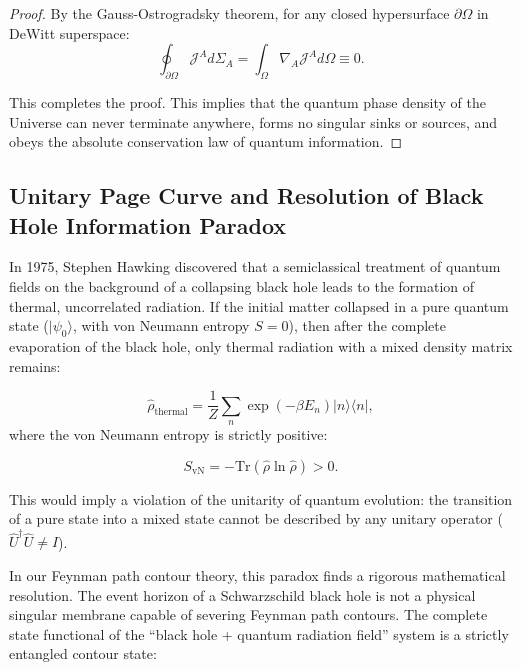 \documentclass[11pt,a4paper]{article}
\theoremstyle{definition}
\begin{document}
\begin{proof}
By the Gauss-Ostrogradsky theorem, for any closed hypersurface $\partial\Omega$ in DeWitt superspace:
\begin{equation}\label{eq:1.105}\tag{1.105}
\oint_{\partial\Omega} \mathcal{J}^A d\Sigma_A = \int_\Omega \nabla_A \mathcal{J}^A d\Omega \equiv 0.
\end{equation}

This completes the proof. This implies that the quantum phase density of the Universe can never terminate anywhere, forms no singular sinks or sources, and obeys the absolute conservation law of quantum information.
\end{proof}

\subsection{Unitary Page Curve and Resolution of Black Hole Information Paradox}\label{sec:1.5}

In 1975, Stephen Hawking discovered that a semiclassical treatment of quantum fields on the background of a collapsing black hole leads to the formation of thermal, uncorrelated radiation. If the initial matter collapsed in a pure quantum state ($|\psi_0\rangle$, with von Neumann entropy $S = 0$), then after the complete evaporation of the black hole, only thermal radiation with a mixed density matrix remains:

\begin{equation}\label{eq:1.106}\tag{1.106}
\hat{\rho}_{\text{thermal}} = \frac{1}{Z} \sum_n \exp(-\beta E_n) |n\rangle \langle n|,
\end{equation}
where the von Neumann entropy is strictly positive:

\begin{equation}\label{eq:1.107}\tag{1.107}
S_{\text{vN}} = -\text{Tr}(\hat{\rho}\ln\hat{\rho}) > 0.
\end{equation}

This would imply a violation of the unitarity of quantum evolution: the transition of a pure state into a mixed state cannot be described by any unitary operator ($\hat{U}^\dagger \hat{U} \ne \hat{I}$).

In our Feynman path contour theory, this paradox finds a rigorous mathematical resolution. The event horizon of a Schwarzschild black hole is not a physical singular membrane capable of severing Feynman path contours. The complete state functional of the ``black hole + quantum radiation field'' system is a strictly entangled contour state:
\end{document}
